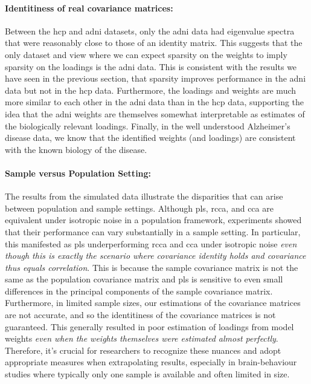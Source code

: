 \paragraph{Identitiness of real covariance matrices:} Between the \acrshort{hcp} and \acrshort{adni} datasets, only the \acrshort{adni} data had eigenvalue spectra that were reasonably close to those of an identity matrix.
This suggests that the only dataset and view where we can expect sparsity on the \gls{weights} to imply sparsity on the \gls{loadings} is the \acrshort{adni} data.
This is consistent with the results we have seen in the previous section, that sparsity improves performance in the \acrshort{adni} data but not in the \acrshort{hcp} data.
Furthermore, the \gls{loadings} and \gls{weights} are much more similar to each other in the \acrshort{adni} data than in the \acrshort{hcp} data, supporting the idea that the \acrshort{adni} \gls{weights} are themselves somewhat interpretable as estimates of the biologically relevant loadings.
Finally, in the well understood Alzheimer's disease data, we know that the identified \gls{weights} (and loadings) are consistent with the known biology of the disease.

\paragraph{Sample versus Population Setting:} The results from the simulated data illustrate the disparities that can arise between population and sample settings.
Although \acrshort{pls}, \acrshort{rcca}, and \acrshort{cca} are equivalent under isotropic noise in a population framework, experiments showed that their performance can vary substantially in a sample setting.
In particular, this manifested as \acrshort{pls} underperforming \acrshort{rcca} and \acrshort{cca} under isotropic noise \textit{even though this is exactly the scenario where covariance identity holds and covariance thus equals correlation}.
This is because the sample covariance matrix is not the same as the population covariance matrix and \acrshort{pls} is sensitive to even small differences in the principal components of the sample covariance matrix.
Furthermore, in limited sample sizes, our estimations of the covariance matrices are not accurate, and so the identitiness of the covariance matrices is not guaranteed.
This generally resulted in poor estimation of \gls{loadings} from model \gls{weights} \textit{even when the \gls{weights} themselves were estimated almost perfectly}.
Therefore, it's crucial for researchers to recognize these nuances and adopt appropriate measures when extrapolating results, especially in brain-behaviour studies where typically only one sample is available and often limited in size.


